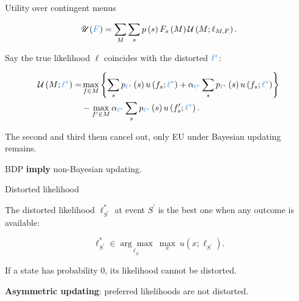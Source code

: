 \documentclass[usenames,dvipsnames,aspectratio=169,11pt, envcountsect, handout]{beamer}
\begin{document}
\begin{frame}[noframenumbering]{Utility over contingent menus}

	{\begingroup
		\[
			\mathscr{U}(\textcolor{blue}{F})= \sum_{M} \sum_{s} p \left( s \right) F_{s} \left( M \right) \mathcal{U} \left(M ; \ell_{M, F} \right) .
		\]

		\endgroup}

	Say the true likelihood \( \ell \) coincides with the distorted \( \textcolor{blue}{\ell^{*}} \):

	\vfill

	\[
		\begin{aligned}
			\mathcal{U} \left(M ; \textcolor{blue}{\ell^{*}} \right) = & \max _{f \in M}\left\{\sum_{s} p_{\textcolor{blue}{\ell^{*}}} \left( s \right) u \left( f_{s} ; \textcolor{blue}{\ell^{*}} \right) + \alpha_{\textcolor{blue}{\ell^{*}}} \sum_{s} p_{\textcolor{blue}{\ell^{*}}} \left( s \right) u \left( f_{s} ; \textcolor{blue}{\ell^{*}} \right) \right\} \\
			                                                           & -\max _{f^{\prime} \in M} \alpha _{\textcolor{blue}{\ell^{*}}} \sum_{s} p_{\textcolor{blue}{\ell^{*}}} \left( s \right) u\left(f^{\prime}_{s} ; \textcolor{blue}{\ell^{*}} \right) .
		\end{aligned}
	\]

	\vfill

	The second and third them cancel out, only EU under Bayesian updating remains.

	\vfill

	BDP \textbf{imply} non-Bayesian updating.

\end{frame}

\begin{frame}{Distorted likelihood}

	The distorted likelihood \( \ell^{*}_{S^{\prime}} \) at event \( S^{\prime} \) is the best one when any outcome is available:

	\vfill

	\[
		\ell^{*}_{S^{\prime}} \in \underset{\ell_{S^{\prime}}}{\arg \max} \: \max_{ x } \: u \left( x ; \ell_{S^{\prime}} \right) .
	\] \pause

	\vfill

	If a state has probability \( 0 \), its likelihood cannot be distorted. \pause

	\vfill

	\textbf{Asymmetric updating}: preferred likelihoods are not distorted.

\end{frame}
\end{document}
